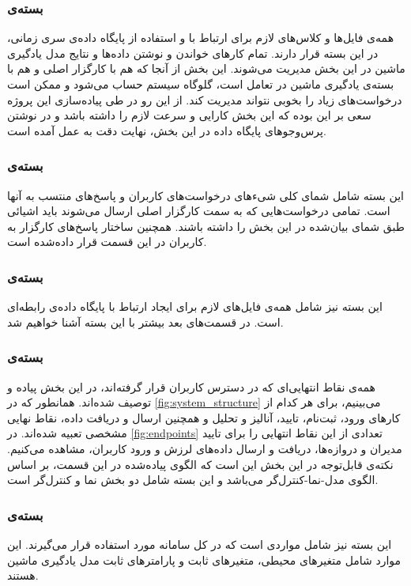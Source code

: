\subsubsection{بسته‌ی }
همه‌ی فایل‌ها و کلاس‌های لازم برای ارتباط با و استفاده از پایگاه داده‌ی سری زمانی، در این بسته قرار دارند. تمام کارهای خواندن و نوشتن داده‌ها و نتایج مدل یادگیری ماشین در این بخش مدیریت می‌شوند. این بخش از آنجا که هم با کارگزار اصلی و هم با بسته‌ی یادگیری ماشین در تعامل است، گلوگاه سیستم حساب می‌شود و ممکن است درخواست‌های زیاد را بخوبی نتواند مدیریت کند. از این رو در طی پیاده‌سازی این پروژه سعی بر این بوده که این بخش کارایی و سرعت لازم را داشته‌ باشد و در نوشتن پرس‌وجوهای پایگاه داده در این بخش، نهایت دقت به عمل آمده است.

\subsubsection{بسته‌ی }
این بسته شامل شمای کلی شی‌ء‌های در‌خواست‌های کاربران و پاسخ‌های منتسب به آنها است\cite{deacon2009model}. تمامی درخواست‌هایی که به سمت کارگزار اصلی ارسال می‌شوند باید اشیائی طبق شمای بیان‌شده در این بخش را داشته‌ باشند. همچنین ساختار پاسخ‌های کارگزار به کاربران در این قسمت قرار داده‌شده است.

\subsubsection{بسته‌ی }
این بسته نیز شامل همه‌ی فایل‌های لازم برای ایجاد ارتباط با پایگاه‌ داده‌ی رابطه‌ای است. در قسمت‌های بعد بیشتر با این بسته آشنا خواهیم شد.

\subsubsection{بسته‌ی }
همه‌ی نقاط انتهایی‌ای که در دسترس کاربران قرار گرفته‌اند، در این بخش پیاده و توصیف شده‌اند. همانطور که در \cref{fig:system_structure} می‌بینیم، برای هر کدام از کارهای ورود، ثبت‌نام، تایید، آنالیز و تحلیل و همچنین ارسال و دریافت داده، نقاط نهایی مشخصی تعبیه ‌شده‌اند. در \cref{fig:endpoints} تعدادی از این نقاط انتهایی را برای تایید مدیران و دروازه‌ها، دریافت و ارسال داده‌های لرزش و ورود کاربران، مشاهده می‌کنیم. نکته‌ی قابل‌توجه در این بخش این است که الگوی پیاده‌شده در این قسمت، بر اساس الگوی مدل-نما-کنترل‌گر\cite{deacon2009model} می‌باشد و این بسته شامل دو بخش نما و کنترل‌گر است.

\subsubsection{بسته‌ی }
این بسته نیز شامل مواردی است که در کل سامانه مورد استفاده قرار می‌گیرند. این موارد شامل متغیر‌های محیطی، متغیر‌های ثابت و پارامتر‌های ثابت مدل یادگیری ماشین هستند.


